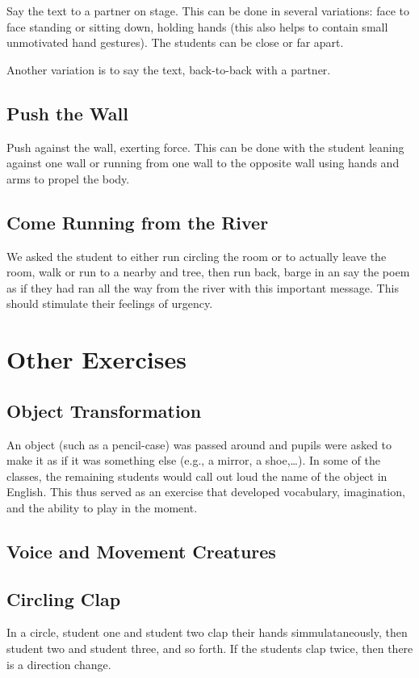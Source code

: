 \documentclass[article,twoside]{memoir}
\begin{document}
Say the text to a partner on stage. This can be done in several variations:
face to face standing or sitting down, holding hands (this also helps to
contain small unmotivated hand gestures). The students can be close or far apart.

Another variation is to say the text, back-to-back with a partner.

\subsection{Push the Wall}

Push against the wall, exerting force. This can be done with the student
leaning against one wall or running from one wall to the opposite wall using
hands and arms to propel the body.

\subsection{Come Running from the River}

We asked the student to either run circling the room or to actually leave the
room, walk or run to a nearby and tree, then run back, barge in an say the poem
as if they had ran all the way from the river with this important message. This
should stimulate their feelings of urgency.

\section{Other Exercises}
\subsection{Object Transformation}
An object (such as a pencil-case) was passed around and pupils were asked to
make it as if it was something else (e.g., a mirror, a shoe,\dots). In some of
the classes, the remaining students would call out loud the name of the object
in English. This thus served as an exercise that developed vocabulary, imagination,
and the ability to play in the moment.

\subsection{Voice and Movement Creatures}
\subsection{Circling Clap}
In a circle, student one and student two clap their hands simmulataneously,
then student two and student three, and so forth. If the students clap twice,
then there is a direction change.
\end{document}
